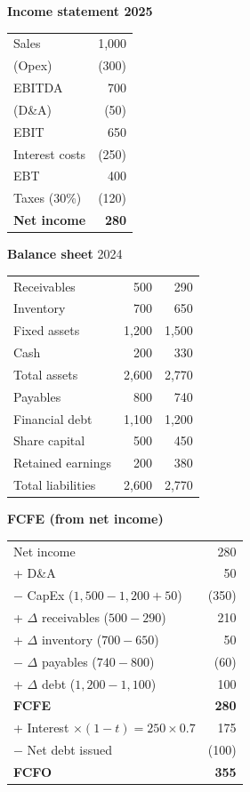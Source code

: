 \begin{exbox}
\small
\begin{minipage}[t]{0.47\linewidth}
\textbf{Income statement 2025}\\[2pt]
\begin{tabular}{@{}lr@{}}
Sales & 1,000\\
(Opex) & (300)\\
\midrule
EBITDA & 700\\
(D\&A) & (50)\\
\midrule
EBIT & 650\\
Interest costs & (250)\\
\midrule
EBT & 400\\
Taxes (30\%) & (120)\\
\midrule
\textbf{Net income} & \textbf{280}
\end{tabular}

\medskip
\textbf{Balance sheet} \hfill 2024 \\[2pt]
\begin{tabular}{@{}lrr@{}}
Receivables & 500 & 290\\
Inventory & 700 & 650\\
Fixed assets & 1,200 & 1,500\\
Cash & 200 & 330\\
\midrule
Total assets & 2,600 & 2,770\\[2pt]
Payables & 800 & 740\\
Financial debt & 1,100 & 1,200\\
Share capital & 500 & 450\\
Retained earnings & 200 & 380\\
\midrule
Total liabilities & 2,600 & 2,770
\end{tabular}
\end{minipage}\hfill
\begin{minipage}[t]{0.5\linewidth}
\textbf{FCFE (from net income)}\\[2pt]
\begin{tabular}{@{}lr@{}}
Net income & 280\\
+ D\&A & 50\\
$-$ CapEx ($1{,}500-1{,}200+50$) & (350)\\
+ $\Delta$ receivables ($500-290$) & 210\\
+ $\Delta$ inventory ($700-650$) & 50\\
$-$ $\Delta$ payables ($740-800$) & (60)\\
+ $\Delta$ debt ($1{,}200-1{,}100$) & 100\\
\midrule
\textbf{FCFE} & \textbf{280}\\
+ Interest $\times(1-t)=250\times0.7$ & 175\\
$-$ Net debt issued & (100)\\
\midrule
\textbf{FCFO} & \textbf{355}
\end{tabular}


\end{minipage}
\end{exbox}
